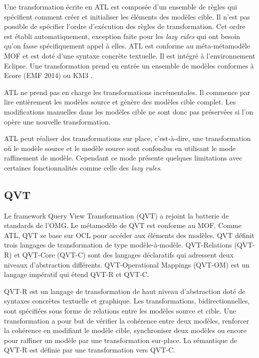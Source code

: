 Une transformation écrite en ATL est composée d'un ensemble de règles qui 
spécifient comment créer et initialiser les éléments des modèles cible. Il n'est 
pas possible de spécifier l'ordre d'exécution des règles de transformation. Cet 
ordre est établi automatiquement, exception faite pour les \textit{lazy rules} 
qui ont besoin qu'on fasse spécifiquement appel à elles. ATL est conforme au 
méta-métamodèle MOF et est doté d'une syntaxe concrète textuelle. Il est intégré 
à l'environnement Eclipse. Une transformation prend en entrée un ensemble de 
modèles conformes à Ecore (EMF 2014) ou KM3 \cite{jouault2006km3}.

ATL ne prend pas en charge les transformations incrémentales. Il commence par 
lire entièrement les modèles source et génère des modèles cible complet. Les 
modifications manuelles dans les modèles cible ne sont donc pas préservées si 
l'on opère une nouvelle transformation.

ATL peut réaliser des transformations sur  place, c'est-à-dire, une 
transformation où le modèle source et le modèle source sont confondus en 
utilisant le mode raffinement de modèle. Cependant ce mode présente quelques 
limitations avec certaines fonctionnalités comme celle des \textit{lazy rules}.

\subsection{QVT}
Le framework Query View Transformation (QVT) \cite{kurtev2008state} 
\cite{omg2011meta} a rejoint la batterie de standards de l'OMG. Le métamodèle de 
QVT est conforme au MOF. Comme ATL, QVT se base sur OCL pour accéder aux 
éléments des modèles.
QVT définit trois langages de transformation de type modèle-à-modèle. 
QVT-Relations (QVT-R) et QVT-Core (QVT-C) sont des langages déclaratifs qui 
adressent deux niveaux d'abstraction différents. QVT-Operational Mappings 
(QVT-OM) est un langage impératif qui étend QVT-R et QVT-C.

QVT-R est un langage de transformation de haut niveau d'abstraction doté de 
syntaxes concrètes textuelle et graphique. Les transformations, 
bidirectionnelles, sont spécifiées sous forme de relations entre les modèles 
source et cible. Une transformation a pour but de vérifier la cohérence entre 
deux modèles, renforcer la cohérence en modifiant le modèle cible, synchroniser 
deux modèles ou encore pour raffiner un modèle par une transformation sur-place. 
La sémantique de QVT-R est définie par une transformation vers QVT-C.

